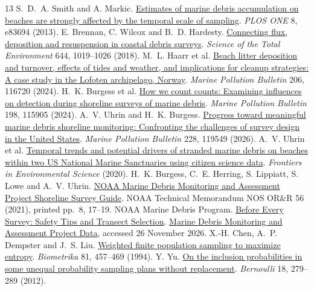 \documentclass[10pt]{article}
\begin{document}
\begin{thebibliography}{13}\small\setlength{\itemsep}{0pt}
 S.~D.~A. Smith and A. Markic. \href{https://doi.org/10.1371/journal.pone.0083694}{Estimates of marine debris accumulation on beaches are strongly affected by the temporal scale of sampling}. \emph{PLOS ONE} 8, e83694 (2013).
 E. Brennan, C. Wilcox and B.~D. Hardesty. \href{https://doi.org/10.1016/j.scitotenv.2018.06.352}{Connecting flux, deposition and resuspension in coastal debris surveys}. \emph{Science of the Total Environment} 644, 1019--1026 (2018).
 M.~L. Haarr et al. \href{https://doi.org/10.1016/j.marpolbul.2024.116720}{Beach litter deposition and turnover, effects of tides and weather, and implications for cleanup strategies: A case study in the Lofoten archipelago, Norway}. \emph{Marine Pollution Bulletin} 206, 116720 (2024).
 H.~K. Burgess et al. \href{https://doi.org/10.1016/j.marpolbul.2023.115905}{How we count counts: Examining influences on detection during shoreline surveys of marine debris}. \emph{Marine Pollution Bulletin} 198, 115905 (2024).
 A.~V. Uhrin and H.~K. Burgess. \href{https://doi.org/10.1016/j.marpolbul.2026.119549}{Progress toward meaningful marine debris shoreline monitoring: Confronting the challenges of survey design in the United States}. \emph{Marine Pollution Bulletin} 228, 119549 (2026).
 A.~V. Uhrin et al. \href{https://doi.org/10.3389/fenvs.2020.604927}{Temporal trends and potential drivers of stranded marine debris on beaches within two US National Marine Sanctuaries using citizen science data}. \emph{Frontiers in Environmental Science} (2020).
 H.~K. Burgess, C.~E. Herring, S. Lippiatt, S. Lowe and A.~V. Uhrin. \href{https://repository.library.noaa.gov/view/noaa/33282/noaa_33282_DS1.pdf}{NOAA Marine Debris Monitoring and Assessment Project Shoreline Survey Guide}. NOAA Technical Memorandum NOS OR\&R 56 (2021), printed pp.~8, 17--19.
 NOAA Marine Debris Program. \href{https://marinedebris.noaa.gov/before-every-survey-safety-tips-and-transect-selection}{Before Every Survey: Safety Tips and Transect Selection}. \href{https://mdmap.orr.noaa.gov/}{Marine Debris Monitoring and Assessment Project Data}, accessed 26 November 2026.
 X.-H. Chen, A.~P. Dempster and J.~S. Liu. \href{https://doi.org/10.1093/biomet/81.3.457}{Weighted finite population sampling to maximize entropy}. \emph{Biometrika} 81, 457--469 (1994).
 Y. Yu. \href{https://doi.org/10.3150/10-BEJ337}{On the inclusion probabilities in some unequal probability sampling plans without replacement}. \emph{Bernoulli} 18, 279--289 (2012).

\end{thebibliography}
\end{document}
